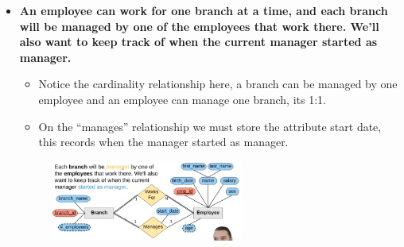 \begin{itemize}
    \item \textbf{An employee can work for one branch at a time, and each branch will be managed by one of the employees that work there. We'll also want to keep track of when the current manager started as manager.}
        \begin{itemize}
            \item Notice the cardinality relationship here, a branch can be managed by one employee and an employee can manage one branch, its 1:1. 
            \item On the ``manages'' relationship we must store the attribute start date, this records when the manager started as manager.
        \end{itemize}
        \begin{figure}[H]
            \centering
            \includegraphics[width=0.6\textwidth]{./Figs/2020-12-24-00-20-01.png}
        \end{figure}
    

\end{itemize}
